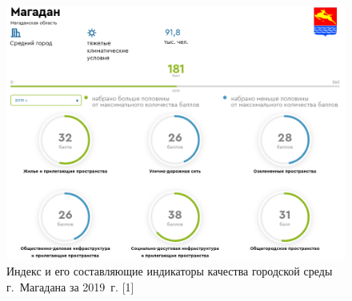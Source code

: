 \begin{figure}[h!]
  \begin{center}
    \includegraphics[width=1\textwidth]{authors/kodirev-fig-1.png}
  \end{center}
  \caption{Индекс и его составляющие индикаторы качества городской среды г.~Магадана за 2019~г. [1]}
  \label{fig:kodirev-fig-1}
\end{figure}
